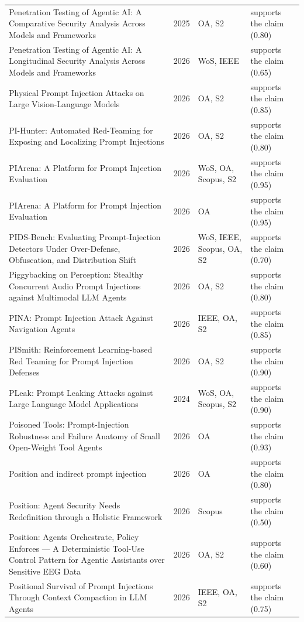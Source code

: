 \begin{longtable}{@{}%
  >{\raggedright\arraybackslash}p{}c%
  >{\raggedright\arraybackslash}p{}%
  >{\raggedright\arraybackslash}p{}@{}}
Penetration Testing of Agentic AI: A Comparative Security Analysis Across Models and Frameworks & 2025 & OA, S2 & supports the claim (0.80) \\
Penetration Testing of Agentic AI: A Longitudinal Security Analysis Across Models and Frameworks & 2026 & WoS, IEEE & supports the claim (0.65) \\
Physical Prompt Injection Attacks on Large Vision-Language Models & 2026 & OA, S2 & supports the claim (0.85) \\
PI-Hunter: Automated Red-Teaming for Exposing and Localizing Prompt Injections & 2026 & OA, S2 & supports the claim (0.80) \\
PIArena: A Platform for Prompt Injection Evaluation & 2026 & WoS, OA, Scopus, S2 & supports the claim (0.95) \\
PIArena: A Platform for Prompt Injection Evaluation & 2026 & OA & supports the claim (0.95) \\
PIDS-Bench: Evaluating Prompt-Injection Detectors Under Over-Defense, Obfuscation, and Distribution Shift & 2026 & WoS, IEEE, Scopus, OA, S2 & supports the claim (0.70) \\
Piggybacking on Perception: Stealthy Concurrent Audio Prompt Injections against Multimodal LLM Agents & 2026 & OA, S2 & supports the claim (0.80) \\
PINA: Prompt Injection Attack Against Navigation Agents & 2026 & IEEE, OA, S2 & supports the claim (0.85) \\
PISmith: Reinforcement Learning-based Red Teaming for Prompt Injection Defenses & 2026 & OA, S2 & supports the claim (0.90) \\
PLeak: Prompt Leaking Attacks against Large Language Model Applications & 2024 & WoS, OA, Scopus, S2 & supports the claim (0.90) \\
Poisoned Tools: Prompt-Injection Robustness and Failure Anatomy of Small Open-Weight Tool Agents & 2026 & OA & supports the claim (0.93) \\
Position and indirect prompt injection & 2026 & OA & supports the claim (0.80) \\
Position: Agent Security Needs Redefinition through a Holistic Framework & 2026 & Scopus & supports the claim (0.50) \\
Position: Agents Orchestrate, Policy Enforces --- A Deterministic Tool-Use Control Pattern for Agentic Assistants over Sensitive EEG Data & 2026 & OA, S2 & supports the claim (0.60) \\
Positional Survival of Prompt Injections Through Context Compaction in LLM Agents & 2026 & IEEE, OA, S2 & supports the claim (0.75) \\

\end{longtable}
